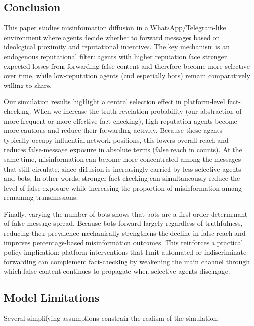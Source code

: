 \subsection{Conclusion}

This paper studies misinformation diffusion in a WhatsApp/Telegram-like environment where agents decide whether to forward messages based on ideological proximity and reputational incentives. The key mechanism is an endogenous reputational filter: agents with higher reputation face stronger expected losses from forwarding false content and therefore become more selective over time, while low-reputation agents (and especially bots) remain comparatively willing to share.

Our simulation results highlight a central selection effect in platform-level fact-checking. When we increase the truth-revelation probability (our abstraction of more frequent or more effective fact-checking), high-reputation agents become more cautious and reduce their forwarding activity. Because these agents typically occupy influential network positions, this lowers overall reach and reduces false-message exposure in absolute terms (false reach in counts). At the same time, misinformation can become more concentrated among the messages that still circulate, since diffusion is increasingly carried by less selective agents and bots. In other words, stronger fact-checking can simultaneously reduce the level of false exposure while increasing the proportion of misinformation among remaining transmissions.

Finally, varying the number of bots shows that bots are a first-order determinant of false-message spread. Because bots forward largely regardless of truthfulness, reducing their prevalence mechanically strengthens the decline in false reach and improves percentage-based misinformation outcomes. This reinforces a practical policy implication: platform interventions that limit automated or indiscriminate forwarding can complement fact-checking by weakening the main channel through which false content continues to propagate when selective agents disengage.

\subsection{Model Limitations}

Several simplifying assumptions constrain the realism of the simulation:


